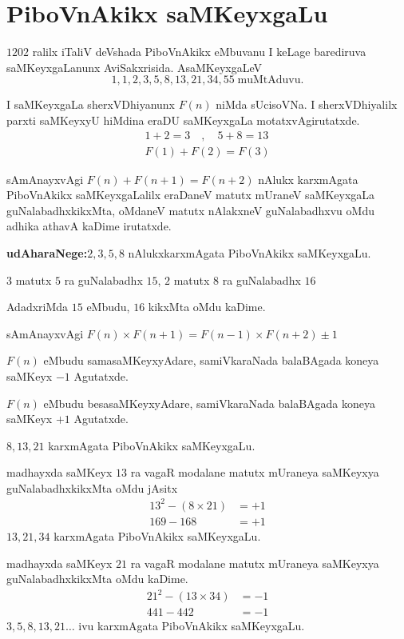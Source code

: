 \chapter{PiboVnAkikx saMKeyxgaLu}
\vskip -20pt

$1202$ ralilx iTaliV deVshada PiboVnAkikx eMbuvanu I keLage barediruva saMKeyxgaLanunx AviSakxrisida. AsaMKeyxgaLeV
$$
1,1,2,3,5,8,13,21,34,55 \;  \text{muMtAduvu}.
$$ 

I saMKeyxgaLa sherxVDhiyanunx $F(n)$ niMda sUcisoVNa. I sherxVDhiyalilx parxti saMKeyxyU hiMdina eraDU saMKeyxgaLa motatxvAgirutatxde.
\begin{gather*}
1+2=3\quad , \quad 5+8=13\\
F(1)+F(2) = F(3)
 \end{gather*}

sAmAnayxvAgi $F(n) + F(n+1) = F(n+2)$ nAlukx karxmAgata PiboVnAkikx saMKeyxgaLalilx eraDaneV matutx mUraneV saMKeyxgaLa guNalabadhxkikxMta, oMdaneV matutx nAlakxneV guNalabadhxvu oMdu adhika athavA kaDime irutatxde.

\textbf{udAharaNege:}\quad $2,3,5,8$ nAlukxkarxmAgata PiboVnAkikx saMKeyxgaLu.

$3$ matutx $5$ ra guNalabadhx $15$, $2$ matutx $8$ ra guNalabadhx $16$  

AdadxriMda $15$ eMbudu, $16$ kikxMta oMdu kaDime.

sAmAnayxvAgi $F(n)\times F(n+1) = F(n-1)\times F(n+2)\pm1$ 

$F(n)$ eMbudu samasaMKeyxyAdare, samiVkaraNada balaBAgada koneya saMKeyx $-1$ Agutatxde.

$F(n)$ eMbudu besasaMKeyxyAdare, samiVkaraNada balaBAgada koneya saMKeyx $+1$ Agutatxde.

$8,13,21$ karxmAgata PiboVnAkikx saMKeyxgaLu.

madhayxda saMKeyx $13$ ra vagaR modalane matutx mUraneya saMKeyxya guNalabadhxkikxMta oMdu jAsitx
\begin{align*}
13^2-(8\times 21) &=+1\\
169-168 &= +1
\end{align*}
$13,21,34$ karxmAgata PiboVnAkikx saMKeyxgaLu. 

madhayxda saMKeyx $21$ ra vagaR  modalane  matutx mUraneya saMKeyxya guNalabadhxkikxMta oMdu kaDime.
\begin{align*}
21^2 - (13\times 34) &= -1 \\
441-442 &= -1
\end{align*}
$3,5,8,13,21\hdots$ ivu karxmAgata PiboVnAkikx saMKeyxgaLu.


